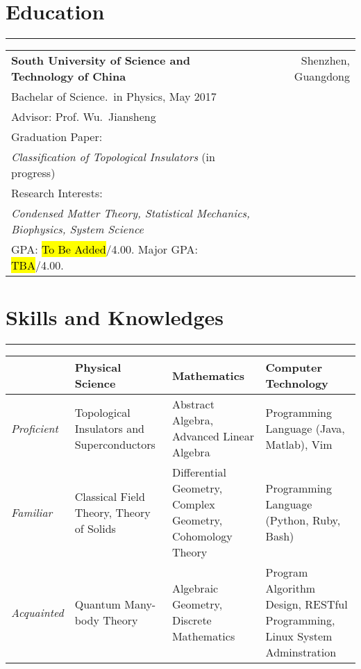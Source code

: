 \documentclass[letterpaper]{article}
\begin{document}
\section*{Education}
\vspace{-8pt}
\hrule height .7pt
\smallskip
\begin{tabular*}{\textwidth}{l@{\extracolsep{\fill}}r}
{\bf\large South University of Science and Technology of China} &
    Shenzhen, Guangdong\\
Bachelar of Science.~in Physics, May 2017 \\
Advisor: Prof. Wu.~Jiansheng \\
Graduation Paper: \\
{\textit{Classification of Topological Insulators }(in
progress)}\\ %
Research Interests: \\
{\textit{Condensed Matter Theory, Statistical Mechanics,
Biophysics, System Science}}\\ %
GPA: \hl{To Be Added}/4.00. Major GPA: \hl{TBA}/4.00.
\\
\end{tabular*}

\section*{Skills and Knowledges}
\vspace{-8pt}
\hrule height .7pt
\vspace{-8pt}
\begin{table}[h]
    \centering
    \begin{tabularx}{\linewidth}{  l X X X  }
     &  Physical Science & Mathematics & Computer Technology \\
    \hline
    \textit{Proficient} & Topological Insulators and Superconductors &
        Abstract Algebra, Advanced Linear Algebra & Programming
        Language (Java, Matlab), Vim \\

    \textit{Familiar} & Classical Field Theory, Theory of Solids &
        Differential Geometry, Complex Geometry, Cohomology Theory &
        Programming Language (Python, Ruby, Bash) \\

    \textit{Acquainted} & Quantum Many-body Theory & Algebraic
        Geometry, Discrete Mathematics & Program Algorithm Design,
        RESTful Programming, Linux System Adminstration\\
    \bottomrule
    \end{tabularx}
\end{table}
\end{document}
